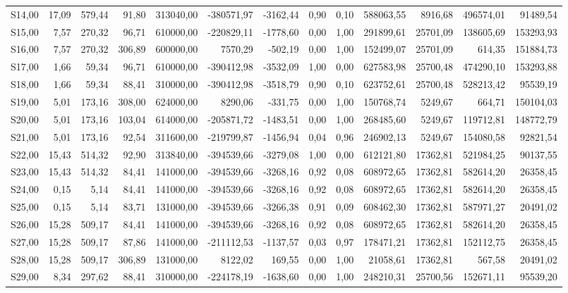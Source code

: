 \begin{longtable}{lrrrrrrrrrrrr}
S14,00 & 17,09 & 579,44 & 91,80 & 313040,00 & -380571,97 & -3162,44 & 0,90 & 0,10 & 588063,55 & 8916,68 & 496574,01 & 91489,54 \\
S15,00 & 7,57 & 270,32 & 96,71 & 610000,00 & -220829,11 & -1778,60 & 0,00 & 1,00 & 291899,61 & 25701,09 & 138605,69 & 153293,93 \\
S16,00 & 7,57 & 270,32 & 306,89 & 600000,00 & 7570,29 & -502,19 & 0,00 & 1,00 & 152499,07 & 25701,09 & 614,35 & 151884,73 \\
S17,00 & 1,66 & 59,34 & 96,71 & 610000,00 & -390412,98 & -3532,09 & 1,00 & 0,00 & 627583,98 & 25700,48 & 474290,10 & 153293,88 \\
S18,00 & 1,66 & 59,34 & 88,41 & 310000,00 & -390412,98 & -3518,79 & 0,90 & 0,10 & 623752,61 & 25700,48 & 528213,42 & 95539,19 \\
S19,00 & 5,01 & 173,16 & 308,00 & 624000,00 & 8290,06 & -331,75 & 0,00 & 1,00 & 150768,74 & 5249,67 & 664,71 & 150104,03 \\
S20,00 & 5,01 & 173,16 & 103,04 & 614000,00 & -205871,72 & -1483,51 & 0,00 & 1,00 & 268485,60 & 5249,67 & 119712,81 & 148772,79 \\
S21,00 & 5,01 & 173,16 & 92,54 & 311600,00 & -219799,87 & -1456,94 & 0,04 & 0,96 & 246902,13 & 5249,67 & 154080,58 & 92821,54 \\
S22,00 & 15,43 & 514,32 & 92,90 & 313840,00 & -394539,66 & -3279,08 & 1,00 & 0,00 & 612121,80 & 17362,81 & 521984,25 & 90137,55 \\
S23,00 & 15,43 & 514,32 & 84,41 & 141000,00 & -394539,66 & -3268,16 & 0,92 & 0,08 & 608972,65 & 17362,81 & 582614,20 & 26358,45 \\
S24,00 & 0,15 & 5,14 & 84,41 & 141000,00 & -394539,66 & -3268,16 & 0,92 & 0,08 & 608972,65 & 17362,81 & 582614,20 & 26358,45 \\
S25,00 & 0,15 & 5,14 & 83,71 & 131000,00 & -394539,66 & -3266,38 & 0,91 & 0,09 & 608462,30 & 17362,81 & 587971,27 & 20491,02 \\
S26,00 & 15,28 & 509,17 & 84,41 & 141000,00 & -394539,66 & -3268,16 & 0,92 & 0,08 & 608972,65 & 17362,81 & 582614,20 & 26358,45 \\
S27,00 & 15,28 & 509,17 & 87,86 & 141000,00 & -211112,53 & -1137,57 & 0,03 & 0,97 & 178471,21 & 17362,81 & 152112,75 & 26358,45 \\
S28,00 & 15,28 & 509,17 & 306,89 & 131000,00 & 8122,02 & 169,55 & 0,00 & 1,00 & 21058,61 & 17362,81 & 567,58 & 20491,02 \\
S29,00 & 8,34 & 297,62 & 88,41 & 310000,00 & -224178,19 & -1638,60 & 0,00 & 1,00 & 248210,31 & 25700,56 & 152671,11 & 95539,20 \\

\end{longtable}
